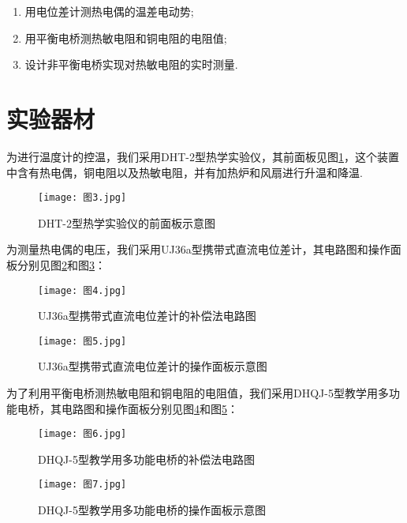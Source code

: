 \documentclass[11pt]{article}
\begin{document}
\begin{enumerate}
	
	\item 用电位差计测热电偶的温差电动势;
	
	\item 用平衡电桥测热敏电阻和铜电阻的电阻值;
	
	\item 设计非平衡电桥实现对热敏电阻的实时测量.
	
\end{enumerate}




\section{实验器材}
为进行温度计的控温，我们采用DHT-2型热学实验仪，其前面板见图\ref{fig:3}，这个装置中含有热电偶，铜电阻以及热敏电阻，并有加热炉和风扇进行升温和降温.

\begin{figure}[htbp]
	\centering
	\texttt{[image: 图3.jpg]}
	\caption{DHT-2型热学实验仪的前面板示意图}
	\label{fig:3}
\end{figure}

为测量热电偶的电压，我们采用UJ36a型携带式直流电位差计，其电路图和操作面板分别见图\ref{fig:4}和图\ref{fig:5}：

\begin{figure}[htbp]
	\centering
	\texttt{[image: 图4.jpg]}
	\caption{UJ36a型携带式直流电位差计的补偿法电路图}
	\label{fig:4}
\end{figure}

\begin{figure}[htbp]
	\centering
	\texttt{[image: 图5.jpg]}
	\caption{UJ36a型携带式直流电位差计的操作面板示意图}
	\label{fig:5}
\end{figure}

为了利用平衡电桥测热敏电阻和铜电阻的电阻值，我们采用DHQJ-5型教学用多功能电桥，其电路图和操作面板分别见图\ref{fig:6}和图\ref{fig:7}：

\begin{figure}[htbp]
	\centering
	\texttt{[image: 图6.jpg]}
	\caption{DHQJ-5型教学用多功能电桥的补偿法电路图}
	\label{fig:6}
\end{figure}

\begin{figure}[htbp]
	\centering
	\texttt{[image: 图7.jpg]}
	\caption{DHQJ-5型教学用多功能电桥的操作面板示意图}
	\label{fig:7}
\end{figure}
\end{document}
